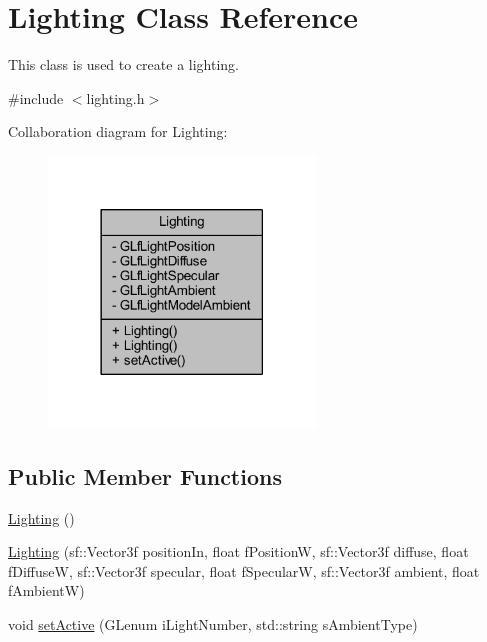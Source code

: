 \hypertarget{class_lighting}{}\section{Lighting Class Reference}
\label{class_lighting}


This class is used to create a lighting.  




{\ttfamily \#include $<$lighting.\+h$>$}



Collaboration diagram for Lighting\+:\nopagebreak
\begin{figure}[H]
\begin{center}
\leavevmode
\includegraphics[width=201pt]{class_lighting__coll__graph}
\end{center}
\end{figure}
\subsection*{Public Member Functions}
\begin{DoxyCompactItemize}
\item 
\hyperlink{class_lighting_a0077cde5c3f7a5a4e24617ce784b416f}{Lighting} ()
\item 
\hyperlink{class_lighting_a6f8057acf2f88c348490872d74273891}{Lighting} (sf\+::\+Vector3f position\+In, float f\+PositionW, sf\+::\+Vector3f diffuse, float f\+DiffuseW, sf\+::\+Vector3f specular, float f\+SpecularW, sf\+::\+Vector3f ambient, float f\+AmbientW)
\item 
void \hyperlink{class_lighting_a067ea4fccca5456f08867ae153f1f9a7}{set\+Active} (G\+Lenum i\+Light\+Number, std\+::string s\+Ambient\+Type)
\end{DoxyCompactItemize}
